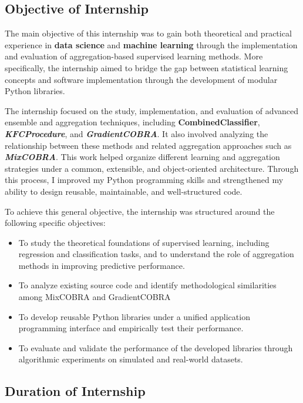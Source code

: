 \subsection{Objective of Internship}

\hs The main objective of this internship was to gain both theoretical and practical experience in \textbf{data science} and \textbf{machine learning} through the implementation and evaluation of aggregation-based supervised learning methods. More specifically, the internship aimed to bridge the gap between statistical learning concepts and software implementation through the development of modular Python libraries.

The internship focused on the study, implementation, and evaluation of advanced ensemble and aggregation techniques, including \textbf{CombinedClassifier}, \textbf{\textit{KFCProcedure}}, and \textbf{\textit{GradientCOBRA}}. It also involved analyzing the relationship between these methods and related aggregation approaches such as \textbf{\textit{MixCOBRA}}. This work helped organize different learning and aggregation strategies under a common, extensible, and object-oriented architecture. Through this process, I improved my Python programming skills and strengthened my ability to design reusable, maintainable, and well-structured code.

To achieve this general objective, the internship was structured around the following specific objectives:

\begin{itemize}
    \item To study the theoretical foundations of supervised learning, including regression and classification tasks, and to understand the role of aggregation methods in improving predictive performance.
    \item To analyze existing source code and identify methodological similarities among MixCOBRA and GradientCOBRA
    \item To develop reusable Python libraries under a unified application programming interface and empirically test their performance.
    \item To evaluate and validate the performance of the developed libraries through algorithmic experiments on simulated and real-world datasets.
\end{itemize}

\subsection{Duration of Internship}

